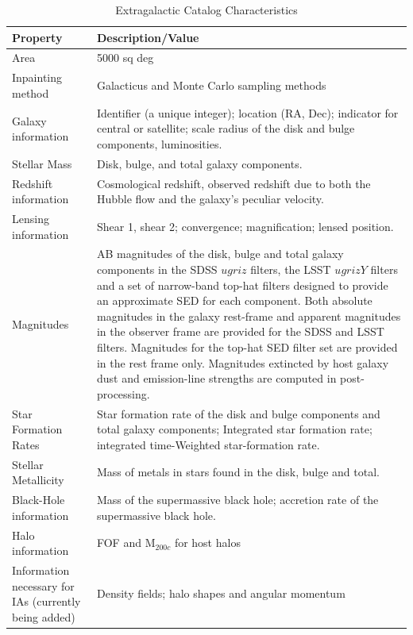 \documentclass[preprint,times]{aastex61}
\begin{document}
\begin{table}[!htb]
  \centering
  \caption{Extragalactic Catalog Characteristics}
  \label{tab:catalog-options}
  \begin{tabular}{| L{0.2\textwidth}| L{0.75\textwidth}| }
    \hline 
    Property                      & Description/Value   \\
    \hline
    Area & 5000 sq deg \\
    Inpainting method      & Galacticus and Monte Carlo sampling methods\\
    Galaxy information     & Identifier (a unique integer); location (RA, Dec); indicator for central or satellite; scale radius of the disk and bulge components, luminosities.\\  Stellar Mass & Disk, bulge, and total galaxy components.\\
    Redshift information  & Cosmological redshift, observed redshift due to both the Hubble flow and the galaxy's peculiar velocity.\\
    Lensing information  & Shear 1, shear 2; convergence; magnification; lensed position.\\
    Magnitudes                & AB magnitudes of the disk, bulge and total galaxy components in the SDSS $ugriz$ filters, the LSST $ugrizY$ filters and a set of narrow-band top-hat filters designed to provide an approximate SED for each component.  Both absolute magnitudes in the galaxy rest-frame and apparent magnitudes in the observer frame are provided for the SDSS and LSST filters. Magnitudes for the top-hat SED filter set are provided in the rest frame only.  Magnitudes extincted by host galaxy dust and emission-line strengths are computed in post-processing.\\
  Star Formation Rates    & Star formation rate of the disk and bulge components and total galaxy components; Integrated star formation rate; integrated time-Weighted star-formation rate.\\
 Stellar Metallicity          & Mass of metals in stars found in the disk, bulge and total.\\ 
Black-Hole information & Mass of the supermassive black hole; accretion rate of the supermassive black hole. \\
Halo information            & FOF and M$_{200c}$ for host halos\\
Information necessary for IAs (currently being added) & Density fields; halo shapes and angular momentum\\
   \hline
  \end{tabular}
\end{table}
\end{document}
